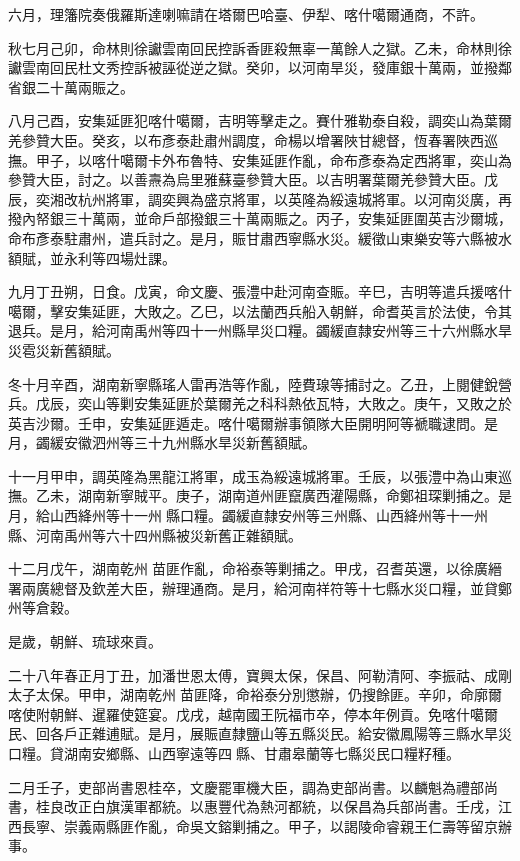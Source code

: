 \begin{pinyinscope}
六月，理籓院奏俄羅斯達喇嘛請在塔爾巴哈臺、伊犁、喀什噶爾通商，不許。

秋七月己卯，命林則徐讞雲南回民控訴香匪殺無辜一萬餘人之獄。乙未，命林則徐讞雲南回民杜文秀控訴被誣從逆之獄。癸卯，以河南旱災，發庫銀十萬兩，並撥鄰省銀二十萬兩賑之。

八月己酉，安集延匪犯喀什噶爾，吉明等擊走之。賽什雅勒泰自殺，調奕山為葉爾羌參贊大臣。癸亥，以布彥泰赴肅州調度，命楊以增署陜甘總督，恆春署陜西巡撫。甲子，以喀什噶爾卡外布魯特、安集延匪作亂，命布彥泰為定西將軍，奕山為參贊大臣，討之。以善燾為烏里雅蘇臺參贊大臣。以吉明署葉爾羌參贊大臣。戊辰，奕湘改杭州將軍，調奕興為盛京將軍，以英隆為綏遠城將軍。以河南災廣，再撥內帑銀三十萬兩，並命戶部撥銀三十萬兩賑之。丙子，安集延匪圍英吉沙爾城，命布彥泰駐肅州，遣兵討之。是月，賑甘肅西寧縣水災。緩徵山東樂安等六縣被水額賦，並永利等四場灶課。

九月丁丑朔，日食。戊寅，命文慶、張澧中赴河南查賑。辛巳，吉明等遣兵援喀什噶爾，擊安集延匪，大敗之。乙巳，以法蘭西兵船入朝鮮，命耆英言於法使，令其退兵。是月，給河南禹州等四十一州縣旱災口糧。蠲緩直隸安州等三十六州縣水旱災雹災新舊額賦。

冬十月辛酉，湖南新寧縣瑤人雷再浩等作亂，陸費瑔等捕討之。乙丑，上閱健銳營兵。戊辰，奕山等剿安集延匪於葉爾羌之科科熱依瓦特，大敗之。庚午，又敗之於英吉沙爾。壬申，安集延匪遁走。喀什噶爾辦事領隊大臣開明阿等褫職逮問。是月，蠲緩安徽泗州等三十九州縣水旱災新舊額賦。

十一月甲申，調英隆為黑龍江將軍，成玉為綏遠城將軍。壬辰，以張澧中為山東巡撫。乙未，湖南新寧賊平。庚子，湖南道州匪竄廣西灌陽縣，命鄭祖琛剿捕之。是月，給山西絳州等十一州縣口糧。蠲緩直隸安州等三州縣、山西絳州等十一州縣、河南禹州等六十四州縣被災新舊正雜額賦。

十二月戊午，湖南乾州苗匪作亂，命裕泰等剿捕之。甲戌，召耆英還，以徐廣縉署兩廣總督及欽差大臣，辦理通商。是月，給河南祥符等十七縣水災口糧，並貸鄭州等倉穀。

是歲，朝鮮、琉球來貢。

二十八年春正月丁丑，加潘世恩太傅，寶興太保，保昌、阿勒清阿、李振祜、成剛太子太保。甲申，湖南乾州苗匪降，命裕泰分別懲辦，仍搜餘匪。辛卯，命廓爾喀使附朝鮮、暹羅使筵宴。戊戌，越南國王阮福巿卒，停本年例貢。免喀什噶爾民、回各戶正雜逋賦。是月，展賑直隸鹽山等五縣災民。給安徽鳳陽等三縣水旱災口糧。貸湖南安鄉縣、山西寧遠等四縣、甘肅皋蘭等七縣災民口糧籽種。

二月壬子，吏部尚書恩桂卒，文慶罷軍機大臣，調為吏部尚書。以麟魁為禮部尚書，桂良改正白旗漢軍都統。以惠豐代為熱河都統，以保昌為兵部尚書。壬戌，江西長寧、崇義兩縣匪作亂，命吳文鎔剿捕之。甲子，以謁陵命睿親王仁壽等留京辦事。


\end{pinyinscope}
